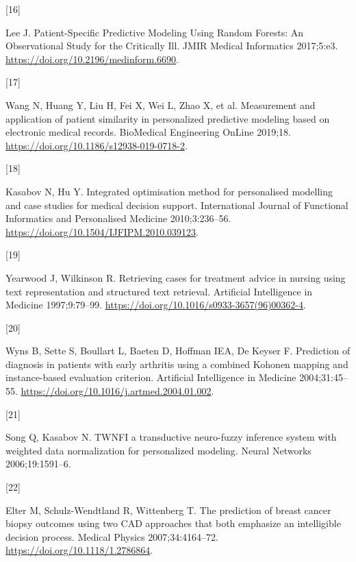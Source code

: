 \documentclass[preprint, 3p,
authoryear]{elsarticle} %
\newlength{\cslhangindent}
\newlength{\csllabelwidth}
\newlength{\cslentryspacingunit} %
\newenvironment{CSLReferences}[2] %
 {%
  \setlength{\parindent}{0pt}
  \ifodd #1
  \let\oldpar\par
  \def\par{\hangindent=\cslhangindent\oldpar}
  \fi
  \setlength{\parskip}{#2\cslentryspacingunit}
 }%
 {}
\newcommand{\CSLLeftMargin}[1]{\parbox[t]{\csllabelwidth}{#1}}
\newcommand{\CSLRightInline}[1]{\parbox[t]{\linewidth - \csllabelwidth}{#1}\break}
\begin{document}
\begin{CSLReferences}{0}{0}
\leavevmode{}%
\CSLLeftMargin{{[}16{]} }%
\CSLRightInline{Lee J. Patient-{Specific Predictive Modeling Using
Random Forests}: {An Observational Study} for the {Critically Ill}. JMIR
Medical Informatics 2017;5:e3.
\url{https://doi.org/10.2196/medinform.6690}.}

\leavevmode{}%
\CSLLeftMargin{{[}17{]} }%
\CSLRightInline{Wang N, Huang Y, Liu H, Fei X, Wei L, Zhao X, et al.
Measurement and application of patient similarity in personalized
predictive modeling based on electronic medical records. BioMedical
Engineering OnLine 2019;18.
\url{https://doi.org/10.1186/s12938-019-0718-2}.}

\leavevmode{}%
\CSLLeftMargin{{[}18{]} }%
\CSLRightInline{Kasabov N, Hu Y. Integrated optimisation method for
personalised modelling and case studies for medical decision support.
International Journal of Functional Informatics and Personalised
Medicine 2010;3:236--56.
\url{https://doi.org/10.1504/IJFIPM.2010.039123}.}

\leavevmode{}%
\CSLLeftMargin{{[}19{]} }%
\CSLRightInline{Yearwood J, Wilkinson R. Retrieving cases for treatment
advice in nursing using text representation and structured text
retrieval. Artificial Intelligence in Medicine 1997;9:79--99.
\url{https://doi.org/10.1016/s0933-3657(96)00362-4}.}

\leavevmode{}%
\CSLLeftMargin{{[}20{]} }%
\CSLRightInline{Wyns B, Sette S, Boullart L, Baeten D, Hoffman IEA, De
Keyser F. Prediction of diagnosis in patients with early arthritis using
a combined {Kohonen} mapping and instance-based evaluation criterion.
Artificial Intelligence in Medicine 2004;31:45--55.
\url{https://doi.org/10.1016/j.artmed.2004.01.002}.}

\leavevmode{}%
\CSLLeftMargin{{[}21{]} }%
\CSLRightInline{Song Q, Kasabov N. {TWNFI} \textemdash{} a transductive
neuro-fuzzy inference system with weighted data normalization for
personalized modeling. Neural Networks 2006;19:1591--6.}

\leavevmode{}%
\CSLLeftMargin{{[}22{]} }%
\CSLRightInline{Elter M, Schulz-Wendtland R, Wittenberg T. The
prediction of breast cancer biopsy outcomes using two {CAD} approaches
that both emphasize an intelligible decision process. Medical Physics
2007;34:4164--72. \url{https://doi.org/10.1118/1.2786864}.}


\end{CSLReferences}
\end{document}
